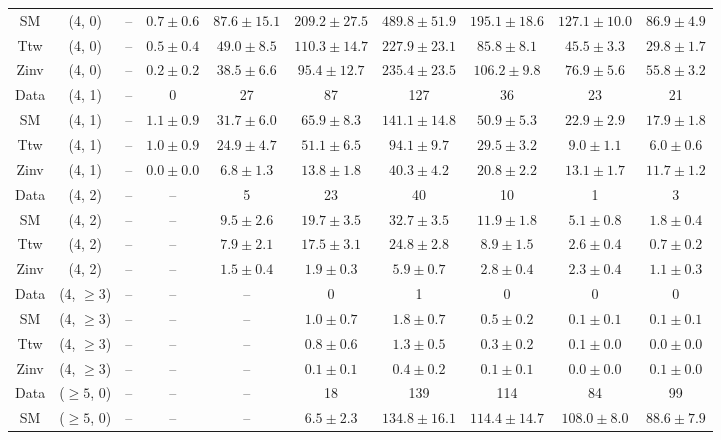 \begin{table}[h!]
{\begin{tabular}{cccccccccc}
	SM & (4, 0) & -- & $0.7\pm 0.6$ & $87.6\pm 15.1$ & $209.2\pm 27.5$ & $489.8\pm 51.9$ & $195.1\pm 18.6$ & $127.1\pm 10.0$ & $86.9\pm 4.9$ \\[0.5ex] 
	Ttw & (4, 0) & -- & $0.5\pm 0.4$ & $49.0\pm 8.5$ & $110.3\pm 14.7$ & $227.9\pm 23.1$ & $85.8\pm 8.1$ & $45.5\pm 3.3$ & $29.8\pm 1.7$ \\[0.5ex] 
	Zinv & (4, 0) & -- & $0.2\pm 0.2$ & $38.5\pm 6.6$ & $95.4\pm 12.7$ & $235.4\pm 23.5$ & $106.2\pm 9.8$ & $76.9\pm 5.6$ & $55.8\pm 3.2$ \\[0.5ex] 
	Data & (4, 1) & -- & 0 & 27 & 87 & 127 & 36 & 23 & 21 \\[0.5ex] 
	SM & (4, 1) & -- & $1.1\pm 0.9$ & $31.7\pm 6.0$ & $65.9\pm 8.3$ & $141.1\pm 14.8$ & $50.9\pm 5.3$ & $22.9\pm 2.9$ & $17.9\pm 1.8$ \\[0.5ex] 
	Ttw & (4, 1) & -- & $1.0\pm 0.9$ & $24.9\pm 4.7$ & $51.1\pm 6.5$ & $94.1\pm 9.7$ & $29.5\pm 3.2$ & $9.0\pm 1.1$ & $6.0\pm 0.6$ \\[0.5ex] 
	Zinv & (4, 1) & -- & $0.0\pm 0.0$ & $6.8\pm 1.3$ & $13.8\pm 1.8$ & $40.3\pm 4.2$ & $20.8\pm 2.2$ & $13.1\pm 1.7$ & $11.7\pm 1.2$ \\[0.5ex] 
	Data & (4, 2) & -- & -- & 5 & 23 & 40 & 10 & 1 & 3 \\[0.5ex] 
	SM & (4, 2) & -- & -- & $9.5\pm 2.6$ & $19.7\pm 3.5$ & $32.7\pm 3.5$ & $11.9\pm 1.8$ & $5.1\pm 0.8$ & $1.8\pm 0.4$ \\[0.5ex] 
	Ttw & (4, 2) & -- & -- & $7.9\pm 2.1$ & $17.5\pm 3.1$ & $24.8\pm 2.8$ & $8.9\pm 1.5$ & $2.6\pm 0.4$ & $0.7\pm 0.2$ \\[0.5ex] 
	Zinv & (4, 2) & -- & -- & $1.5\pm 0.4$ & $1.9\pm 0.3$ & $5.9\pm 0.7$ & $2.8\pm 0.4$ & $2.3\pm 0.4$ & $1.1\pm 0.3$ \\[0.5ex] 
	Data & (4, $\ge3$) & -- & -- & -- & 0 & 1 & 0 & 0 & 0 \\[0.5ex] 
	SM & (4, $\ge3$) & -- & -- & -- & $1.0\pm 0.7$ & $1.8\pm 0.7$ & $0.5\pm 0.2$ & $0.1\pm 0.1$ & $0.1\pm 0.1$ \\[0.5ex] 
	Ttw & (4, $\ge3$) & -- & -- & -- & $0.8\pm 0.6$ & $1.3\pm 0.5$ & $0.3\pm 0.2$ & $0.1\pm 0.0$ & $0.0\pm 0.0$ \\[0.5ex] 
	Zinv & (4, $\ge3$) & -- & -- & -- & $0.1\pm 0.1$ & $0.4\pm 0.2$ & $0.1\pm 0.1$ & $0.0\pm 0.0$ & $0.1\pm 0.0$ \\[0.5ex] 
	Data & ($\ge5$, 0) & -- & -- & -- & 18 & 139 & 114 & 84 & 99 \\[0.5ex] 
	SM & ($\ge5$, 0) & -- & -- & -- & $6.5\pm 2.3$ & $134.8\pm 16.1$ & $114.4\pm 14.7$ & $108.0\pm 8.0$ & $88.6\pm 7.9$ \\[0.5ex] 

\end{tabular}}
\end{table}
